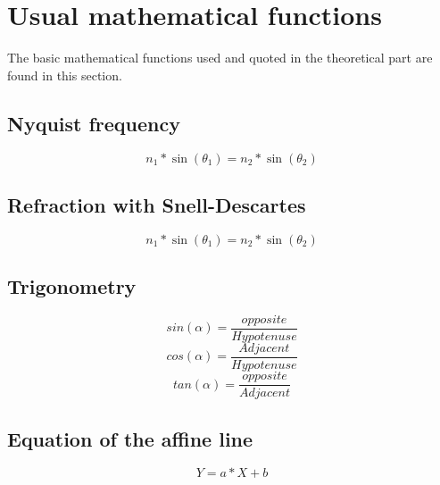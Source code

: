 \section{Usual mathematical functions}
The basic mathematical functions used and quoted in the theoretical part are found in this section.
\subsection{Nyquist frequency}
\begin{equation}\label{eq:Nyquist}
      n_1*\sin(\theta_1)=n_2*\sin(\theta_2)
\end{equation}
\subsection{Refraction with Snell-Descartes}
\begin{equation}\label{eq:Snell}
      n_1*\sin(\theta_1)=n_2*\sin(\theta_2)
\end{equation}
\subsection{Trigonometry}
\begin{equation}\label{eq:Trigo_sin}
      sin(\alpha) = \frac{opposite}{Hypotenuse}
\end{equation}
\begin{equation}\label{eq:Trigo_cos}
      cos(\alpha) = \frac{Adjacent}{Hypotenuse}
\end{equation}
\begin{equation}\label{eq:Trigo_tan}
      tan(\alpha) = \frac{opposite}{Adjacent}
\end{equation}
\subsection{Equation of the affine line}
\begin{equation}\label{eq:DoiteAffine}
      Y = a*X+b
\end{equation}
